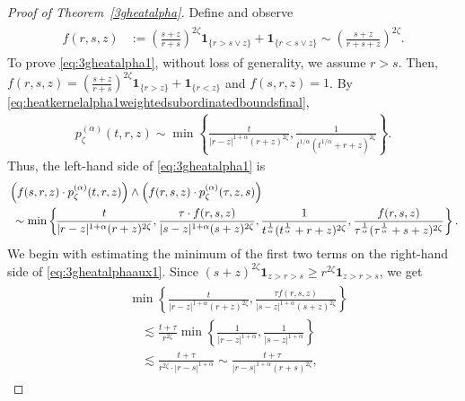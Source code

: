\documentclass[12pt,reqno,a4paper]{amsart}
\theoremstyle{definition}
\theoremstyle{remark}
\numberwithin{equation}{section}
\newcommand{\1}{\mathbbm{1}}
\newcommand{\one}{\mathbf{1}}
\begin{document}
\begin{proof}[Proof of Theorem~\ref{3gheatalpha}]
  Define and observe
  \begin{align}
    \label{eq:deffaux}
    \begin{split}
      f(r,s,z)
      & := \left(\frac{s+z}{r+s}\right)^{2\zeta}\one_{\{r>s\vee z\}} + \one_{\{r<s\vee z\}}
        \sim \left(\frac{s+z}{r+s+z}\right)^{2\zeta}.
    \end{split}
  \end{align}
  To prove \eqref{eq:3gheatalpha1}, without loss of generality, we assume $r>s$. Then,
  $f(r,s,z)= \left(\tfrac{s+z}{r+s}\right)^{2\zeta}\one_{\{r>z\}} + \one_{\{r<z\}}$
  and $f(s,r,z)=1$.
  By \eqref{eq:heatkernelalpha1weightedsubordinatedboundsfinal},
  \begin{align}
    p_\zeta^{(\alpha)}(t,r,z)
    \sim \min\left\{\frac{t}{|r-z|^{1+\alpha} (r+z)^{2\zeta}},\frac{1}{t^{1/\alpha}(t^{1/\alpha}+r+z)^{2\zeta}}\right\}.
  \end{align}
  Thus, the left-hand side of \eqref{eq:3gheatalpha1} is
  \begin{align}
    \scriptsize
    \label{eq:3gheatalphaaux1}
    \begin{split}
      & \left(f(s,r,z) \cdot p_\zeta^{(\alpha)}(t,r,z)\right) \wedge \left(f(r,s,z) \cdot p_\zeta^{(\alpha)}(\tau,z,s)\right) \\
      & \ \sim \min\left\{\! \frac{t}{|r-z|^{1+\alpha}(r+z)^{2\zeta}},\frac{\tau\cdot f(r,s,z)}{|s-z|^{1+\alpha}(s+z)^{2\zeta}}, \frac{1}{t^{\frac1\alpha}(t^{\frac1\alpha}+r+z)^{2\zeta}},\frac{f(r,s,z)}{\tau^{\frac1\alpha}(\tau^{\frac1\alpha}+s+z)^{2\zeta}}\right\}.
    \end{split}
  \end{align}
  We begin with estimating the minimum of the first two terms on the right-hand side of \eqref{eq:3gheatalphaaux1}. Since $(s+z)^{2\zeta}\one_{z>r>s}\geq r^{2\zeta}\one_{z>r>s}$, we get
  \begin{align}
    \label{eq:3gheatalphaaux2}
    \begin{split}
      & \min\left\{\frac{t}{|r-z|^{1+\alpha}(r+z)^{2\zeta}},\frac{\tau f(r,s,z)}{|s-z|^{1+\alpha}(s+z)^{2\zeta}}\right\} \\
      & \quad \lesssim \frac{t+\tau}{r^{2\zeta}}\min\left\{\frac{1}{|r-z|^{1+\alpha}},\frac{1}{|s-z|^{1+\alpha}}\right\} \\
      & \quad \lesssim \frac{t+\tau}{r^{2\zeta}\cdot|r-s|^{1+\alpha}}
      \sim \frac{t+\tau}{|r-s|^{1+\alpha}(r+s)^{2\zeta}},
    \end{split}

\end{align}
\end{proof}
\end{document}

